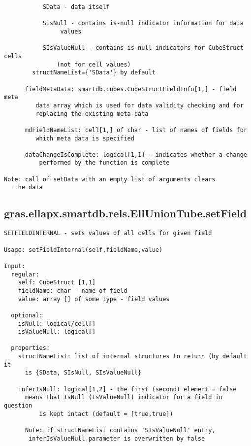\begin{verbatim}
           SData - data itself

           SIsNull - contains is-null indicator information for data
                values

           SIsValueNull - contains is-null indicators for CubeStruct cells
               (not for cell values)
        structNameList={'SData'} by default

      fieldMetaData: smartdb.cubes.CubeStructFieldInfo[1,] - field meta
         data array which is used for data validity checking and for
         replacing the existing meta-data

      mdFieldNameList: cell[1,] of char - list of names of fields for
         which meta data is specified

      dataChangeIsComplete: logical[1,1] - indicates whether a change
          performed by the function is complete

Note: call of setData with an empty list of arguments clears
   the data
\end{verbatim}
\subsection{\texorpdfstring{gras.ellapx.smartdb.rels.EllUnionTube.setField}{setField}}\label{method:gras.ellapx.smartdb.rels.EllUnionTube.setField}
\begin{verbatim}
SETFIELDINTERNAL - sets values of all cells for given field

Usage: setFieldInternal(self,fieldName,value)

Input:
  regular:
    self: CubeStruct [1,1]
    fieldName: char - name of field
    value: array [] of some type - field values

  optional:
    isNull: logical/cell[]
    isValueNull: logical[]

  properties:
    structNameList: list of internal structures to return (by default it
      is {SData, SIsNull, SIsValueNull}

    inferIsNull: logical[1,2] - the first (second) element = false
      means that IsNull (IsValueNull) indicator for a field in question
          is kept intact (default = [true,true])

      Note: if structNameList contains 'SIsValueNull' entry,
       inferIsValueNull parameter is overwritten by false
\end{verbatim}
